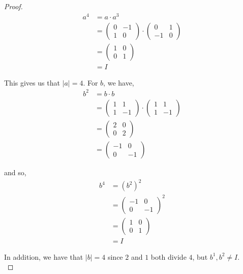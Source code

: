 \documentclass[11pt, reqno]{amsart}
\theoremstyle{plain}
\theoremstyle{definition}
\theoremstyle{example}
\begin{document}
\begin{enumerate}[1.]
\begin{enumerate}
\begin{proof}
\begin{align*}
a^4 &= a \cdot a^3\\
&=  \begin{pmatrix} 0 & -1 \\ 1 & 0 \end{pmatrix} \cdot \begin{pmatrix} 0 & 1 \\ -1 & 0 \end{pmatrix}\\
&= \begin{pmatrix} 1 & 0 \\ 0 & 1 \end{pmatrix} \\
&= I
\end{align*}

This gives us that $|a| = 4$. For $b$, we have,
\begin{align*}
b^2 &= b \cdot b\\
&= \begin{pmatrix} 1 & 1 \\ 1 & -1 \end{pmatrix} \cdot \begin{pmatrix} 1 & 1 \\ 1 & -1 \end{pmatrix}\\
&= \begin{pmatrix} 2 & 0 \\ 0 & 2 \end{pmatrix}\\
&= \begin{pmatrix} -1 & 0 \\ 0 & -1 \end{pmatrix}
\end{align*}

and so,
\begin{align*}
b^4 &= (b^2)^2\\
&= \begin{pmatrix} -1 & 0 \\ 0 & -1 \end{pmatrix}^2\\
&= \begin{pmatrix} 1 & 0 \\ 0 & 1 \end{pmatrix}\\
&= I
\end{align*}

In addition, we have that $|b| = 4$ since $2$ and $1$ both divide $4$, but $b^1, b^2 \neq I$.\\


\end{proof}
\end{enumerate}
\end{enumerate}
\end{document}
